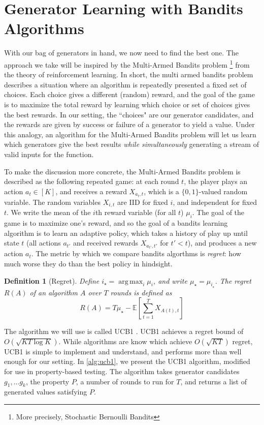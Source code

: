 \documentclass[10pt,a4paper]{article}
\newtheorem{definition}{Definition}
\DeclareMathOperator*{\argmax}{arg\,max}
\begin{document}
\section{Generator Learning with Bandits Algorithms}
\label{sec:bandits}
With our bag of generators in hand, we now need to find the best one. The approach we take will be inspired by the Multi-Armed Bandits \cite{} problem \footnote{More precisely, Stochastic Bernoulli Bandits} from the theory of reinforcement learning. In short, the multi armed bandits problem describes a situation where an algorithm is repeatedly presented a fixed set of choices. Each choice gives a different (random) reward, and the goal of the game is to maximize the total reward by learning which choice or set of choices gives the best rewards. In our setting, the ``choices" are our generator candidates, and the rewards are given by success or failure of a generator to yield a value. Under this analogy, an algorithm for the Multi-Armed Bandits problem will let us learn which generators give the best results \textit{while simultaneously} generating a stream of valid inputs for the function.

To make the discussion more concrete, the Multi-Armed Bandits problem is described as the following repeated game: at each round $t$, the player plays an action $a_t \in [K]$, and receives a reward $X_{{a_t},t}$, which is a $\{0,1\}$-valued random variable. The random variables $X_{i,t}$ are IID for fixed $i$, and independent for fixed $t$. We write the mean of the $i$th reward variable (for all $t$) $\mu_i$. The goal of the game is to maximize one's reward, and so the goal of a bandits learning algorithm is to learn an adaptive policy, which takes a history of play up until state $t$ (all actions $a_{t'}$ and received rewards $X_{a_{t'},t'}$ for $t' < t$), and produces a new action $a_t$. The metric by which we compare bandits algorthms is \textit{regret}: how much worse they do than the best policy in hindsight.

\begin{definition}[Regret]
Define $i_\star = \argmax_i \mu_i$, and write $\mu_\star = \mu_{i_\star}$. The regret $R(A)$ of an algorithm $A$ over $T$ rounds is defined as
$$
R(A) = T\mu_\star - \mathbb{E}\left[\sum_{t=1}^T X_{A(t),t}\right]
$$
\end{definition}

The algorithm we will use is called UCB1 \cite{}. UCB1 achieves a regret bound of $O(\sqrt{KT\log K})$. While algorithms are know which achieve $O(\sqrt{KT})$ regret, UCB1 is simple to implement and understand, and performs more than well enough for our setting. In \autoref{alg:ucb1}, we present the UCB1 algorithm, modified for use in property-based testing. The algorithm takes generator candidates $g_1,\dots g_k$, the property $P$, a number of rounds to run for $T$, and returns a list of generated values satisfying $P$.
\end{document}
